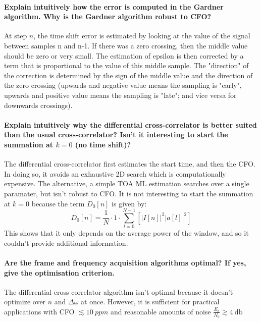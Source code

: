 \paragraph{Explain intuitively how the error is computed in the Gardner algorithm. Why is the
Gardner algorithm robust to CFO?} At step $n$, the time shift error is estimated by looking at the value of the signal between samples n and n-1. If there was a zero crossing, then the middle value should be zero or very small. The estimation of epsilon is then corrected by a term that is proportional to the value of this middle sample. The "direction" of the correction is determined by the sign of the middle value and the direction of the zero crossing (upwards and negative value means the sampling is "early", upwards and positive value means the sampling is "late"; and vice versa for downwards crossings).

\paragraph{Explain intuitively why the differential cross-correlator is better suited than the usual cross-correlator? Isn’t it interesting to start the summation at $k = 0$ (no time shift)?}
The differential cross-correlator first estimates the start time, and then the CFO. In doing so, it avoids an exhaustive 2D search which is computationally expensive. The alternative, a simple TOA ML estimation searches over a single paramater, but isn't robust to CFO.
It is not interesting to start the summation at $k = 0$ because the term $D_0[n]$ is given by:
\[
D_0[n] = \frac{1}{N}\cdot1\cdot\sum_{l=0}^{N-1} \left [ \big | I[n] \big | ^2 \big | a[l] \big | ^2 \right ]
\]
This shows that it only depends on the average power of the window, and so it couldn't provide additional information.

\paragraph{Are the frame and frequency acquisition algorithms optimal? If yes, give the optimisation criterion.}
The differential cross correlator algorithm isn't optimal because it doesn't optimize over $n$ and $\Delta \omega$ at once. However, it is sufficient for practical applications with CFO $\lesssim \SI{10}{ppm}$ and reasonable amounts of noise $\frac{E_b}{N_0} \gtrsim \SI{4}{\decibel}$
